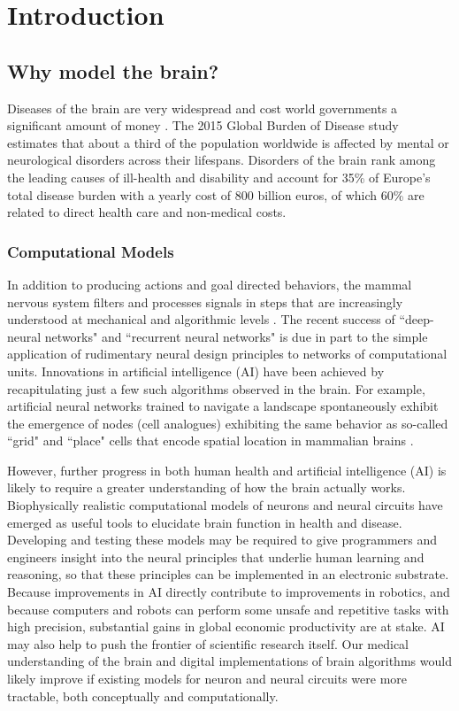 \chapter{Introduction}
\section{Why model the brain?}
Diseases of the brain are very widespread and cost world governments a significant amount of money \citep{who}.
The 2015 Global Burden of Disease study estimates that about a third of the population worldwide is affected by mental or neurological disorders across their lifespans.
Disorders of the brain rank among the leading causes of ill-health and disability and account for 35\% of Europe’s total disease burden with a yearly cost of 800 billion euros, of which 60\% are related to direct health care and non-medical costs\citep{who}. 
\subsection{Computational Models}
In addition to producing actions and goal directed behaviors, the mammal nervous system filters and processes signals in steps that are increasingly understood at mechanical and algorithmic levels \citep{marr1976understanding}.
The recent success of ``deep-neural networks" and ``recurrent neural networks" is due in part to the simple application of rudimentary neural design principles to networks of computational units.
Innovations in artificial intelligence (AI) have been achieved by recapitulating just a few such algorithms observed in the brain.
For example, artificial neural networks trained to navigate a landscape spontaneously exhibit the emergence of nodes (cell analogues) exhibiting the same behavior as so-called ``grid" and ``place" cells that encode spatial location in mammalian brains \citep{banino2018vector}.

However, further progress in both human health and artificial intelligence (AI) is likely to require a greater understanding of how the brain actually works.
Biophysically realistic computational models of neurons and neural circuits have emerged as useful tools to elucidate brain function in health and disease.
Developing and testing these models may be required to give programmers and engineers insight into the neural principles that underlie human learning and reasoning, so that these principles can be implemented in an electronic substrate.
Because improvements in AI directly contribute to improvements in robotics, and because computers and robots can perform some unsafe and repetitive tasks with high precision, substantial gains in global economic productivity are at stake.
AI may also help to push the frontier of scientific research itself.
Our medical understanding of the brain and digital implementations of brain algorithms would likely improve if existing models for neuron and neural circuits were more tractable, both conceptually and computationally.

